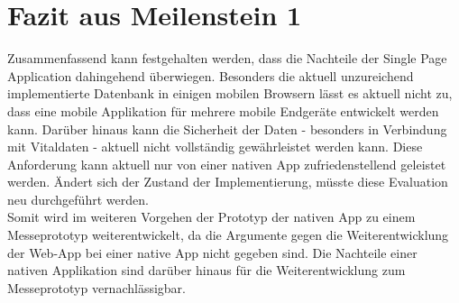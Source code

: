 \section{Fazit aus Meilenstein 1}
\label{sec:gegenueberstellung-fazit}
Zusammenfassend kann festgehalten werden, dass die Nachteile der Single Page Application dahingehend überwiegen. Besonders die aktuell unzureichend implementierte Datenbank in einigen mobilen Browsern lässt es aktuell nicht zu, dass eine mobile Applikation für mehrere mobile Endgeräte entwickelt werden kann. Darüber hinaus kann die Sicherheit der Daten - besonders in Verbindung mit Vitaldaten - aktuell nicht vollständig gewährleistet werden kann. Diese Anforderung kann aktuell nur von einer nativen \gls{App} zufriedenstellend geleistet werden. 
Ändert sich der Zustand der Implementierung, müsste diese Evaluation neu durchgeführt werden. \\
Somit wird im weiteren Vorgehen der Prototyp der nativen \gls{App} zu einem Messeprototyp weiterentwickelt, da die Argumente gegen die Weiterentwicklung der \ac{Web-App} bei einer native \gls{App} nicht gegeben sind. Die Nachteile einer nativen Applikation sind darüber hinaus für die Weiterentwicklung zum Messeprototyp vernachlässigbar.
